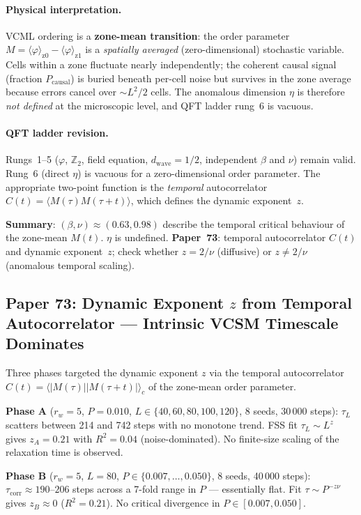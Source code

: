 \documentclass[11pt]{article}
\begin{document}
\paragraph{Physical interpretation.}
VCML ordering is a \textbf{zone-mean transition}: the order parameter
$M=\langle\varphi\rangle_{\mathrm{z}0}-\langle\varphi\rangle_{\mathrm{z}1}$
is a \emph{spatially averaged} (zero-dimensional) stochastic variable.
Cells within a zone fluctuate nearly independently; the coherent causal signal
(fraction $P_\mathrm{causal}$) is buried beneath per-cell noise but survives
in the zone average because errors cancel over ${\sim}L^2/2$ cells.
The anomalous dimension $\eta$ is therefore \emph{not defined} at the microscopic
level, and QFT ladder rung~6 is vacuous.

\paragraph{QFT ladder revision.}
Rungs~1--5 ($\varphi$, $\mathbb{Z}_2$, field equation, $d_\mathrm{wave}{=}1/2$,
independent $\beta$ and $\nu$) remain valid.
Rung~6 (direct $\eta$) is vacuous for a zero-dimensional order parameter.
The appropriate two-point function is the \emph{temporal} autocorrelator
$C(t)=\langle M(\tau)M(\tau{+}t)\rangle$, which defines the dynamic exponent~$z$.

\textbf{Summary}: $(\beta,\nu)\approx(0.63,0.98)$ describe the temporal
critical behaviour of the zone-mean $M(t)$.
$\eta$ is undefined.
\textbf{Paper~73}: temporal autocorrelator $C(t)$ and dynamic exponent~$z$;
check whether $z=2/\nu$ (diffusive) or $z\neq2/\nu$ (anomalous temporal scaling).

\subsection*{Paper 73: Dynamic Exponent $z$ from Temporal Autocorrelator --- Intrinsic VCSM Timescale Dominates}

Three phases targeted the dynamic exponent $z$ via the temporal autocorrelator
$C(t)=\langle|M(\tau)||M(\tau{+}t)|\rangle_c$ of the zone-mean order parameter.

\textbf{Phase A} ($r_w{=}5$, $P{=}0.010$, $L\in\{40,60,80,100,120\}$, 8 seeds, 30\,000 steps):
$\tau_L$ scatters between 214 and 742 steps with no monotone trend.
FSS fit $\tau_L\sim L^z$ gives $z_A=0.21$ with $R^2=0.04$ (noise-dominated).
No finite-size scaling of the relaxation time is observed.

\textbf{Phase B} ($r_w{=}5$, $L{=}80$, $P\in\{0.007,\ldots,0.050\}$, 8 seeds, 40\,000 steps):
$\tau_\mathrm{corr}\approx190$--$206$ steps across a 7-fold range in $P$ --- essentially flat.
Fit $\tau\sim P^{-z\nu}$ gives $z_B\approx0$ ($R^2=0.21$).
No critical divergence in $P\in[0.007,0.050]$.
\end{document}
